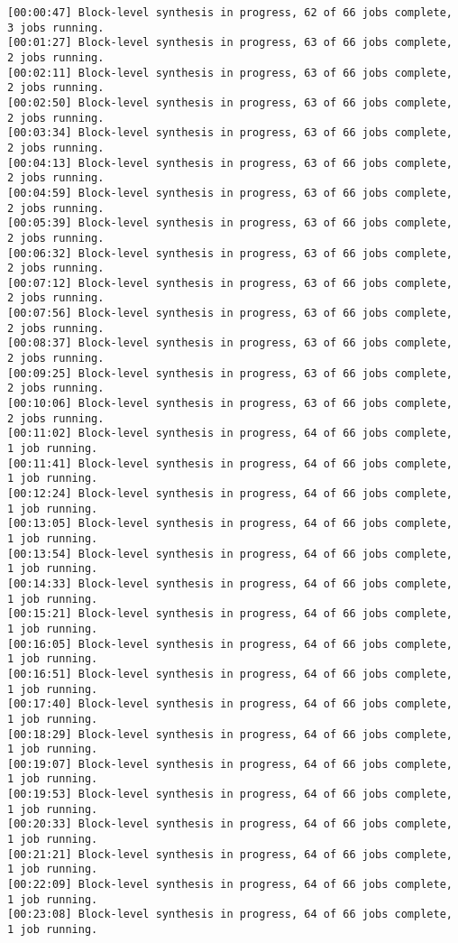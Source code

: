 \begin{lstlisting}[label=lst:code_2,caption=Содержимое файла  v++*.log]
[00:00:47] Block-level synthesis in progress, 62 of 66 jobs complete, 3 jobs running.
[00:01:27] Block-level synthesis in progress, 63 of 66 jobs complete, 2 jobs running.
[00:02:11] Block-level synthesis in progress, 63 of 66 jobs complete, 2 jobs running.
[00:02:50] Block-level synthesis in progress, 63 of 66 jobs complete, 2 jobs running.
[00:03:34] Block-level synthesis in progress, 63 of 66 jobs complete, 2 jobs running.
[00:04:13] Block-level synthesis in progress, 63 of 66 jobs complete, 2 jobs running.
[00:04:59] Block-level synthesis in progress, 63 of 66 jobs complete, 2 jobs running.
[00:05:39] Block-level synthesis in progress, 63 of 66 jobs complete, 2 jobs running.
[00:06:32] Block-level synthesis in progress, 63 of 66 jobs complete, 2 jobs running.
[00:07:12] Block-level synthesis in progress, 63 of 66 jobs complete, 2 jobs running.
[00:07:56] Block-level synthesis in progress, 63 of 66 jobs complete, 2 jobs running.
[00:08:37] Block-level synthesis in progress, 63 of 66 jobs complete, 2 jobs running.
[00:09:25] Block-level synthesis in progress, 63 of 66 jobs complete, 2 jobs running.
[00:10:06] Block-level synthesis in progress, 63 of 66 jobs complete, 2 jobs running.
[00:11:02] Block-level synthesis in progress, 64 of 66 jobs complete, 1 job running.
[00:11:41] Block-level synthesis in progress, 64 of 66 jobs complete, 1 job running.
[00:12:24] Block-level synthesis in progress, 64 of 66 jobs complete, 1 job running.
[00:13:05] Block-level synthesis in progress, 64 of 66 jobs complete, 1 job running.
[00:13:54] Block-level synthesis in progress, 64 of 66 jobs complete, 1 job running.
[00:14:33] Block-level synthesis in progress, 64 of 66 jobs complete, 1 job running.
[00:15:21] Block-level synthesis in progress, 64 of 66 jobs complete, 1 job running.
[00:16:05] Block-level synthesis in progress, 64 of 66 jobs complete, 1 job running.
[00:16:51] Block-level synthesis in progress, 64 of 66 jobs complete, 1 job running.
[00:17:40] Block-level synthesis in progress, 64 of 66 jobs complete, 1 job running.
[00:18:29] Block-level synthesis in progress, 64 of 66 jobs complete, 1 job running.
[00:19:07] Block-level synthesis in progress, 64 of 66 jobs complete, 1 job running.
[00:19:53] Block-level synthesis in progress, 64 of 66 jobs complete, 1 job running.
[00:20:33] Block-level synthesis in progress, 64 of 66 jobs complete, 1 job running.
[00:21:21] Block-level synthesis in progress, 64 of 66 jobs complete, 1 job running.
[00:22:09] Block-level synthesis in progress, 64 of 66 jobs complete, 1 job running.
[00:23:08] Block-level synthesis in progress, 64 of 66 jobs complete, 1 job running.

\end{lstlisting}

